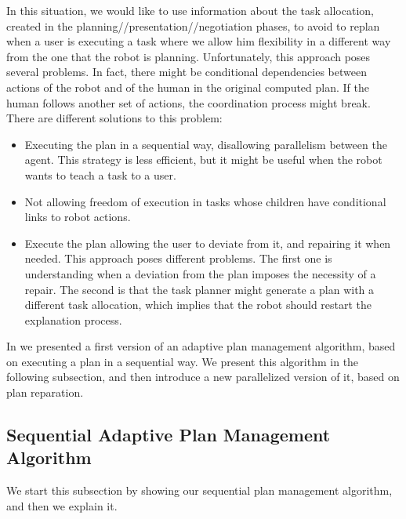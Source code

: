 In this situation, we would like to use information about the task allocation, created in the planning//presentation//negotiation phases, to avoid to replan when a user is executing a task where we allow him flexibility in a different way from the one that the robot is planning.  Unfortunately, this approach poses several problems. In fact, there might be conditional dependencies between actions of the robot and of the human in the original computed plan. If the human follows another set of actions, the coordination process might break. There are different solutions to this problem:
\begin{itemize}
	\item Executing the plan in a sequential way, disallowing parallelism between the agent. This strategy is less efficient, but it might be useful when the robot wants to teach a task to a user.
	\item Not allowing freedom of execution in tasks whose children have conditional links to robot actions. 
	\item Execute the plan allowing the user to deviate from it, and repairing it when needed. This approach poses different problems. The first one is understanding when a deviation from the plan imposes the necessity of a repair. The second is that the task planner might generate a plan with a different task allocation, which implies that the robot should restart the explanation process.
\end{itemize}

In \cite{milliez2016using} we presented a first version of an adaptive plan management algorithm, based on executing a plan in a sequential way. We present this algorithm in the following subsection, and then introduce a new parallelized version of it, based on plan reparation.

\subsection{Sequential Adaptive Plan Management Algorithm}
\label{subsec:plan_management-sequential_plan_management}
We start this subsection by showing our sequential plan management algorithm, and then we explain it.

